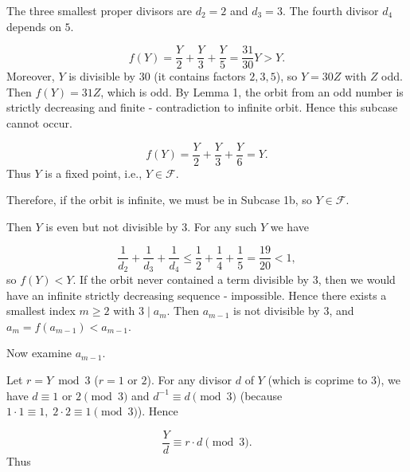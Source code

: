 The three smallest proper divisors are \(d_2=2\) and \(d_3=3\). The fourth divisor \(d_4\) depends on \(5\).\par
{}
\[
f(Y)=\frac{Y}{2}+\frac{Y}{3}+\frac{Y}{5}=\frac{31}{30}Y>Y.
\]
Moreover, \(Y\) is divisible by \(30\) (it contains factors \(2,3,5\)), so \(Y=30Z\) with \(Z\) odd. Then \(f(Y)=31Z\), which is odd. By Lemma 1, the orbit from an odd number is strictly decreasing and finite - contradiction to infinite orbit. Hence this subcase cannot occur.\par
{}
\[
f(Y)=\frac{Y}{2}+\frac{Y}{3}+\frac{Y}{6}=Y.
\]
Thus \(Y\) is a fixed point, i.e., \(Y\in\mathcal{F}\).\par
Therefore, if the orbit is infinite, we must be in Subcase 1b, so \(Y\in\mathcal{F}\).\par
{}
Then \(Y\) is even but not divisible by \(3\). For any such \(Y\) we have\par
\[
\frac{1}{d_2}+\frac{1}{d_3}+\frac{1}{d_4}\le\frac{1}{2}+\frac{1}{4}+\frac{1}{5}=\frac{19}{20}<1,
\]
so \(f(Y)<Y\). If the orbit never contained a term divisible by \(3\), then we would have an infinite strictly decreasing sequence - impossible. Hence there exists a smallest index \(m\ge2\) with \(3\mid a_m\). Then \(a_{m-1}\) is not divisible by \(3\), and \(a_m=f(a_{m-1})<a_{m-1}\).\par
Now examine \(a_{m-1}\).\par
{}
Let \(r=Y\bmod 3\) (\(r=1\) or \(2\)). For any divisor \(d\) of \(Y\) (which is coprime to \(3\)), we have \(d\equiv1\) or \(2\pmod3\) and \(d^{-1}\equiv d\pmod3\) (because \(1\cdot1\equiv1,\;2\cdot2\equiv1\pmod3\)). Hence\par
\[
\frac{Y}{d}\equiv r\cdot d\pmod3.
\]
Thus\par
